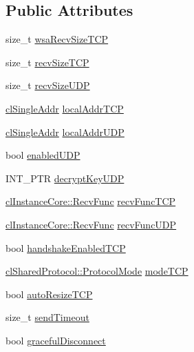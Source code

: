 \subsection*{Public Attributes}
\begin{DoxyCompactItemize}
\item 
size\_\-t \hyperlink{classcl_instance_profile_ae3682372f32240378daadac7a3a5ab50}{wsaRecvSizeTCP}
\item 
size\_\-t \hyperlink{classcl_instance_profile_a8fe7056f9e48febf975fbbc932df6395}{recvSizeTCP}
\item 
size\_\-t \hyperlink{classcl_instance_profile_a0e937475af0a5614f0475a819aa1b73e}{recvSizeUDP}
\item 
\hyperlink{classcl_single_addr}{clSingleAddr} \hyperlink{classcl_instance_profile_ad968a9a15fd6a31479c55a067fe09573}{localAddrTCP}
\item 
\hyperlink{classcl_single_addr}{clSingleAddr} \hyperlink{classcl_instance_profile_a76c869ac22c63b389ac5d49b9eb21862}{localAddrUDP}
\item 
bool \hyperlink{classcl_instance_profile_ad9d28cad949aec335b92f31d822d0bf6}{enabledUDP}
\item 
INT\_\-PTR \hyperlink{classcl_instance_profile_ace072043f8984052fd263bcfecc73e4e}{decryptKeyUDP}
\item 
\hyperlink{classcl_instance_core_afa96c2a2c0b26b6a9256b87798bf9587}{clInstanceCore::RecvFunc} \hyperlink{classcl_instance_profile_a5256ee272d945f53112a34b5c18136fa}{recvFuncTCP}
\item 
\hyperlink{classcl_instance_core_afa96c2a2c0b26b6a9256b87798bf9587}{clInstanceCore::RecvFunc} \hyperlink{classcl_instance_profile_a87180abaad2454e208eab1d4343ee926}{recvFuncUDP}
\item 
bool \hyperlink{classcl_instance_profile_ab315c60cef677fc2ffafab78eeca2d52}{handshakeEnabledTCP}
\item 
\hyperlink{classcl_shared_protocol_a4b0b9c82b8ae4eee78c6308c35afd47b}{clSharedProtocol::ProtocolMode} \hyperlink{classcl_instance_profile_aa33da57b3f604aa9f0df3e2f2e0642cf}{modeTCP}
\item 
bool \hyperlink{classcl_instance_profile_a2f0358eb3bcd10a5dfa0ccca55afbf4a}{autoResizeTCP}
\item 
size\_\-t \hyperlink{classcl_instance_profile_a3542eb64b33a9a54a15dcf9a141cd870}{sendTimeout}
\item 
bool \hyperlink{classcl_instance_profile_a05d0823b2bb852c4ba77c052ef27f250}{gracefulDisconnect}
\item 

\end{DoxyCompactItemize}
